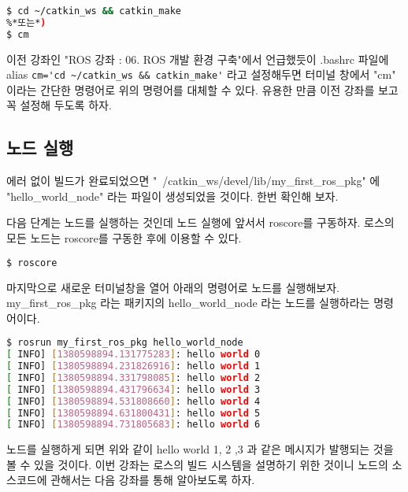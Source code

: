 \begin{lstlisting}[language=bash]
$ cd ~/catkin_ws && catkin_make
%*또는*)
$ cm
\end{lstlisting}

\noindent
이전 강좌인 "ROS 강좌 : 06. ROS 개발 환경 구축"에서 언급했듯이 .bashrc 파일에 alias \verb|cm='cd ~/catkin_ws && catkin_make'| 라고 설정해두면 터미널 창에서 "cm" 이라는 간단한 명령어로 위의 명령어를 대체할 수 있다. 유용한 만큼 이전 강좌를 보고 꼭 설정해 두도록 하자.

\subsection{노드 실행}

에러 없이 빌드가 완료되었으면 "~/catkin\_ws/devel/lib/my\_first\_ros\_pkg" 에 "hello\_world\_node" 라는 파일이 생성되었을 것이다. 한번 확인해 보자.

다음 단계는 노드를 실행하는 것인데 노드 실행에 앞서서 roscore를 구동하자. 로스의 모든 노드는 roscore를 구동한 후에 이용할 수 있다.

\begin{lstlisting}[language=bash]
$ roscore
\end{lstlisting}

\noindent
마지막으로 새로운 터미널창을 열어 아래의 명령어로 노드를 실행해보자. my\_first\_ros\_pkg 라는 패키지의 hello\_world\_node 라는 노드를 실행하라는 명령어이다.

\begin{lstlisting}[language=bash]
$ rosrun my_first_ros_pkg hello_world_node 
[ INFO] [1380598894.131775283]: hello world 0
[ INFO] [1380598894.231826916]: hello world 1
[ INFO] [1380598894.331798085]: hello world 2
[ INFO] [1380598894.431796634]: hello world 3
[ INFO] [1380598894.531808660]: hello world 4
[ INFO] [1380598894.631800431]: hello world 5
[ INFO] [1380598894.731805683]: hello world 6
\end{lstlisting}

\noindent
노드를 실행하게 되면 위와 같이 hello world 1, 2 ,3 과 같은 메시지가 발행되는 것을 볼 수 있을 것이다. 이번 강좌는 로스의 빌드 시스템을 설명하기 위한 것이니 노드의 소스코드에 관해서는 다음 강좌를 통해 알아보도록 하자.


